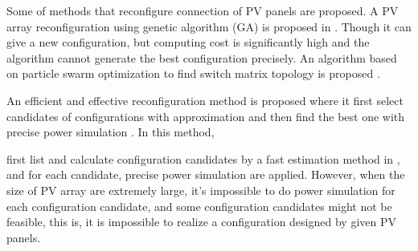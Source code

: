 \documentclass[conference]{IEEEtran}
\begin{document}
Some of methods that reconfigure connection of PV panels are proposed. A PV array reconfiguration using genetic algorithm (GA) is proposed in \cite{carotenuto2015evolutionary}. Though it can give a new configuration, but computing cost is significantly high and the algorithm cannot generate the best configuration precisely.  
An algorithm based on particle swarm optimization to find switch matrix topology is proposed \cite{iraji2017optimisation}. 


An efficient and effective reconfiguration method is proposed where it first select candidates of configurations with approximation and then find the best one with precise power simulation \cite{orozco2016optimized}. 
In this method,%


first list and calculate configuration candidates by a fast estimation method in \cite{orozco2015fast}, and for each candidate, precise power simulation are applied. However, when the size of PV array are extremely large, it's impossible to do power simulation for each configuration candidate, and some configuration candidates might not be feasible, this is, it is impossible to realize a configuration designed by given PV panels.

\end{document}
